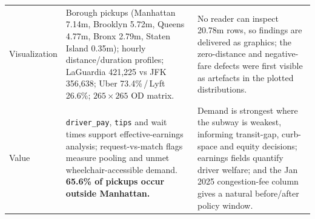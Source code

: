 \begin{table}[htbp]
\begin{tabular}{@{}p{1.5cm}p{7.3cm}p{7.3cm}@{}}
Visualiz\-ation &
Borough pickups (Manhattan 7.14m, Brooklyn 5.72m, Queens 4.77m, Bronx 2.79m,
Staten Island 0.35m); hourly distance/duration profiles; LaGuardia 421{,}225
vs JFK 356{,}638; Uber 73.4\%\,/\,Lyft 26.6\%; $265{\times}265$ OD matrix. &
No reader can inspect 20.78m rows, so findings are delivered as graphics; the
zero-distance and negative-fare defects were first visible as artefacts in the
plotted distributions. \\
\addlinespace

Value &
\texttt{driver\_pay}, \texttt{tips} and wait times support effective-earnings
analysis; request-vs-match flags measure pooling and unmet
wheelchair-accessible demand. \textbf{65.6\% of pickups occur outside
Manhattan.} &
Demand is strongest where the subway is weakest, informing transit-gap,
curb-space and equity decisions; earnings fields quantify driver welfare; and
the Jan 2025 congestion-fee column gives a natural before/after policy
window. \\
\bottomrule
\end{tabular}
\end{table}
